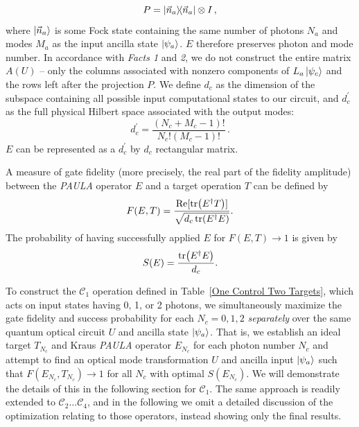 \documentclass[aps,pra,twocolumn,superscriptaddress,floatfix,10pt]{revtex4}
\begin{document}
\begin{equation}
P = \outerproduct{\vec{n}_a}{\vec{n}_a} \otimes I\,,
\end{equation}
where $\ket{\vec{n}_a}$ is some Fock state 
containing the same number of photons $N_a$ and modes $M_a$ as the input ancilla state $\ket{\psi_a}$. $E$ therefore preserves photon and mode number. In accordance with \textit{Facts 1} and \textit{2}, we do not construct the entire matrix $A(U)$ -- only the columns associated with nonzero components of $L_a \ket{\psi_{c}}$ and the rows left after the projection $P$. We define $d_c$ as the dimension of the subspace containing all possible input computational states to our circuit, and $d_c^\prime$ as the full physical Hilbert space associated with the output modes:
\begin{equation}
	d_c^\prime = \frac{(N_c+M_c-1)!}{N_c! (M_c-1)!} \,.
\end{equation}
$E$ can be represented as a $d_c^\prime$ by $d_c$ rectangular matrix.

A measure of gate fidelity (more precisely, the real part of the fidelity amplitude) between the \textit{PAULA} operator $E$ and a target operation $T$ can be defined by
\begin{equation}
\label{Gate Fidelity}
F(E,T) = \frac{\Re[\tr(E^\dagger T)]}{\sqrt{d_c \tr(E^\dagger E)} }.
\end{equation}
The probability of having successfully applied $E$ for $F(E,T) \rightarrow 1$ is given by
\begin{equation}
\label{Success Probability} 
S(E) = \frac{\tr(E^\dagger E)}{d_c}.
\end{equation}

To construct the $\mathcal{C}_1$ operation defined in Table~\ref{One Control Two Targets}, which acts on input states having 0, 1, or 2 photons, we simultaneously maximize the gate fidelity and success probability for each  $N_c=0,1,2$ \textit{separately} over the same quantum optical circuit $U$ and ancilla state $\ket{\psi_a}$. That is, we establish an ideal target $T_{N_c}$ and Kraus \textit{PAULA} operator $E_{N_c}$ for each photon number $N_c$ and attempt to find an optical mode transformation $U$ and ancilla input $\ket{\psi_a}$ such that  $F(E_{N_c},T_{N_c}) \rightarrow 1$ for all $N_c$ with optimal $S(E_{N_c})$. We will demonstrate the details of this in the following section for $\mathcal{C}_1$. The same approach is readily extended to $\mathcal{C}_2 \dots \mathcal{C}_4$, and in the following we omit a detailed discussion of the optimization relating to those operators, instead showing only the final results.
\end{document}
